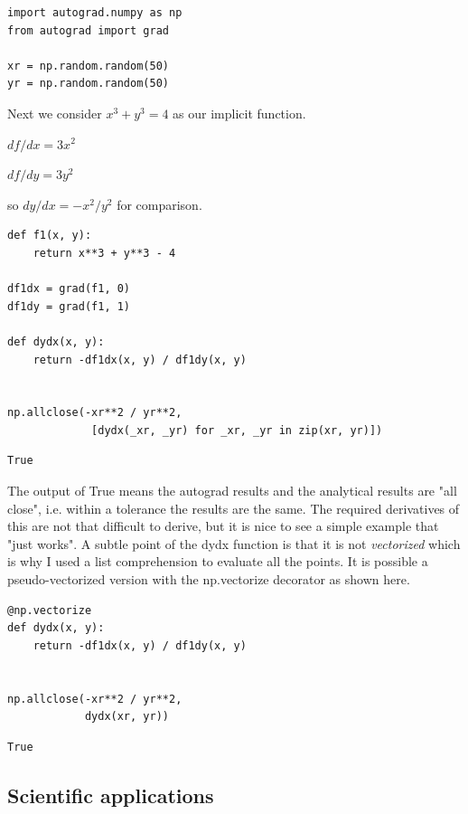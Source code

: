 \documentclass[11pt]{article}
\begin{document}
\begin{verbatim}
import autograd.numpy as np
from autograd import grad

xr = np.random.random(50)
yr = np.random.random(50)
\end{verbatim}

Next we consider \(x^3 + y^3 = 4\) as our implicit function.

\(df/dx = 3 x^2\)

\(df/dy = 3 y^2\)

so \(dy/dx = -x^2 / y^2\) for comparison.

\begin{verbatim}
def f1(x, y):
    return x**3 + y**3 - 4

df1dx = grad(f1, 0)
df1dy = grad(f1, 1)

def dydx(x, y):
    return -df1dx(x, y) / df1dy(x, y)


np.allclose(-xr**2 / yr**2,
             [dydx(_xr, _yr) for _xr, _yr in zip(xr, yr)])
\end{verbatim}

\begin{verbatim}
True
\end{verbatim}

The output of True means the autograd results and the analytical results are "all close", i.e. within a tolerance the results are the same. The required derivatives of this are not that difficult to derive, but it is nice to see a simple example that "just works". A subtle point of the dydx function is that it is not \emph{vectorized} which is why I used a list comprehension to evaluate all the points. It is possible a pseudo-vectorized version with the np.vectorize decorator as shown here.

\begin{verbatim}
@np.vectorize
def dydx(x, y):
    return -df1dx(x, y) / df1dy(x, y)


np.allclose(-xr**2 / yr**2,
            dydx(xr, yr))
\end{verbatim}

\begin{verbatim}
True
\end{verbatim}

\subsection{Scientific applications}
\label{sec:org0e308b2}
\end{document}
